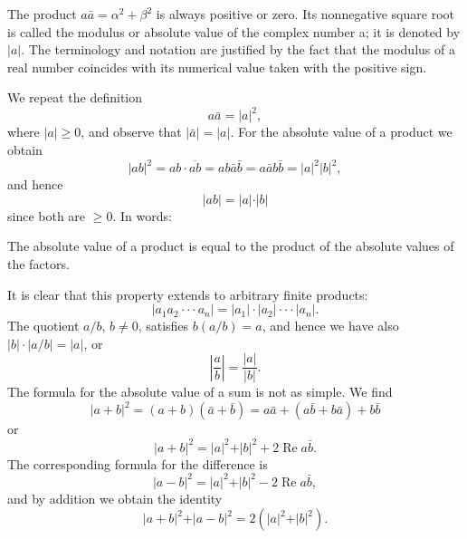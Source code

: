 The product $a\bar{a} = \alpha^{2} + \beta^{2}$ is always positive or zero. Its nonnegative square root is called the modulus or absolute value of the complex number a; it is denoted by $|a|$. The terminology and notation are justified by
the fact that the modulus of a real number coincides with its numerical value taken with the positive sign.

We repeat the definition
\begin{equation*}
a \bar {a} = | a | ^ {2},
\end{equation*}
where $|a| \geq 0$, and observe that $|\bar{a}| = |a|$. For the absolute value of a product we obtain
\begin{equation*}
\left| a b \right| ^ {2} = a b \cdot \overline {{{a b}}} = a b \bar {a} \bar {b} = a \bar {a} b \bar {b} = | a | ^ {2} | b | ^ {2},
\end{equation*}
and hence
\begin{equation*}
\vert a b \vert = \vert a \vert \cdot \vert b \vert
\end{equation*}
since both are $\geq 0$. In words:

The absolute value of a product is equal to the product of the absolute values of the factors.

It is clear that this property extends to arbitrary finite products:
\begin{equation*}
\left| a _ {1} a _ {2} \cdot \cdot \cdot a _ {n} \right| = \left| a _ {1} \right| \cdot \left| a _ {2} \right| \cdot \cdot \cdot \left| a _ {n} \right|.
\end{equation*}
The quotient $a / b$, $b \neq 0$, satisfies $b(a / b) = a$, and hence we have also $|b| \cdot |a / b| = |a|$, or
\begin{equation*}
\left| \frac {a}{b} \right| = \frac {| a |}{| b |}.
\end{equation*}
The formula for the absolute value of a sum is not as simple. We find
\begin{equation*}
\vert a + b \vert^ {2} = (a + b) (\bar {a} + \bar {b}) = a \bar {a} + (a \bar {b} + b \bar {a}) + b \bar {b}
\end{equation*}
or
\begin{equation*}
\vert a + b \vert^ {2} = \vert a \vert^ {2} + \vert b \vert^ {2} + 2 \operatorname{Re} a \bar {b}.\tag{7}\label{eq:1.7}
\end{equation*}
The corresponding formula for the difference is
\begin{equation*}
\vert a - b \vert^ {2} = \vert a \vert^ {2} + \vert b \vert^ {2} - 2 \operatorname{Re} a \bar {b},\tag{7'}\label{eq:1.7'}
\end{equation*}
and by addition we obtain the identity
\begin{equation*}
\vert a + b \vert^ {2} + \vert a - b \vert^ {2} = 2 (\vert a \vert^ {2} + \vert b \vert^ {2}).\tag{8}\label{eq:1.8}
\end{equation*}
